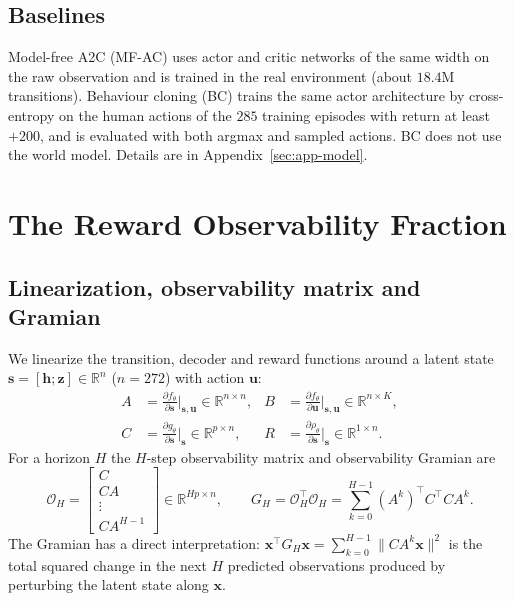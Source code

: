 \documentclass[11pt]{article}
\newcommand{\norm}[1]{\lVert #1 \rVert}
\newcommand{\R}{\mathbb{R}}
\theoremstyle{remark}
\begin{document}
\subsection{Baselines}
\label{sec:mfac-method}
\label{sec:bc-method}

Model-free A2C (MF-AC) uses actor and critic networks of the same width on the raw observation and is trained in the real environment (about $18.4$M transitions). Behaviour cloning (BC) trains the same actor architecture by cross-entropy on the human actions of the $285$ training episodes with return at least $+200$, and is evaluated with both argmax and sampled actions. BC does not use the world model. Details are in Appendix~\ref{sec:app-model}.

\section{The Reward Observability Fraction}
\label{sec:rof}

\subsection{Linearization, observability matrix and Gramian}
\label{sec:jacobian}

We linearize the transition, decoder and reward functions around a latent state $\bm{s} = [\bm{h};\bm{z}] \in \R^n$ ($n{=}272$) with action $\bm{u}$:
\begin{align}
  A &= \frac{\partial f_\theta}{\partial \bm{s}}\biggr|_{\bm{s},\bm{u}}
    \in \R^{n \times n},
  &
  B &= \frac{\partial f_\theta}{\partial \bm{u}}\biggr|_{\bm{s},\bm{u}}
    \in \R^{n \times K},
  \label{eq:AB}
  \\[4pt]
  C &= \frac{\partial g_\theta}{\partial \bm{s}}\biggr|_{\bm{s}}
    \in \R^{p \times n},
  &
  R &= \frac{\partial \rho_\theta}{\partial \bm{s}}\biggr|_{\bm{s}}
    \in \R^{1 \times n}.
  \label{eq:CR}
\end{align}
For a horizon $H$ the $H$-step observability matrix and observability Gramian are
\begin{equation}
  \mathcal{O}_H = \begin{bmatrix} C \\ CA \\ \vdots \\ CA^{H-1} \end{bmatrix} \in \R^{Hp \times n},
  \qquad
  G_H = \mathcal{O}_H^\top \mathcal{O}_H = \sum_{k=0}^{H-1} (A^k)^\top C^\top C A^k .
  \label{eq:gramian}
\end{equation}
The Gramian has a direct interpretation: $\bm{x}^\top G_H \bm{x} = \sum_{k=0}^{H-1} \norm{C A^k \bm{x}}^2$ is the total squared change in the next $H$ predicted observations produced by perturbing the latent state along $\bm{x}$.
\end{document}
